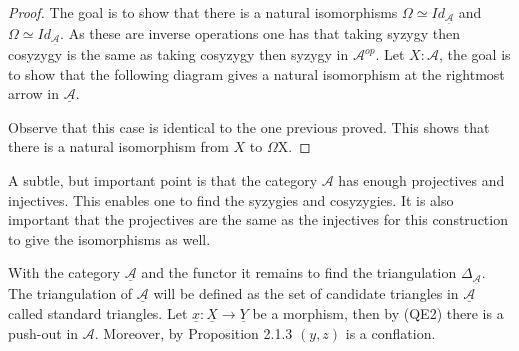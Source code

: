     \begin{proof}
        The goal is to show that there is a natural isomorphisms $\Omega$\upside{$\Omega$}$\simeq Id_{\underline{\mathcal{A}}}$ and \upside{$\Omega$}$\Omega\simeq Id_{\underline{\mathcal{A}}}$. As these are inverse operations one has that taking syzygy then cosyzygy is the same as taking cosyzygy then syzygy in $\mathcal{A}^{op}$.
        Let $X:\mathcal{A}$, the goal is to show that the following diagram gives a natural isomorphism at the rightmost arrow in $\underline{\mathcal{A}}$.
        \begin{center}
        \end{center}
        Observe that this case is identical to the one previous proved. This shows that there is a natural isomorphism from $X$ to \upside{$\Omega$}$\Omega$X.
    \end{proof}

    \begin{remark}
        A subtle, but important point is that the category $\mathcal{A}$ has enough projectives and injectives. This enables one to find the syzygies and cosyzygies. It is also important that the projectives are the same as the injectives for this construction to give the isomorphisms as well.
    \end{remark}

    With the category $\underline{\mathcal{A}}$ and the functor \upside{$\Omega$} it remains to find the triangulation $\Delta_{\underline{\mathcal{A}}}$. The triangulation of $\underline{\mathcal{A}}$ will be defined as the set of candidate triangles in $\underline{\mathcal{A}}$ called standard triangles. Let $\underline{x}:\underline{X}\rightarrow\underline{Y}$ be a morphism, then by (QE2) there is a push-out in $\mathcal{A}$. Moreover, by Proposition 2.1.3 $(y,z)$ is a conflation.

